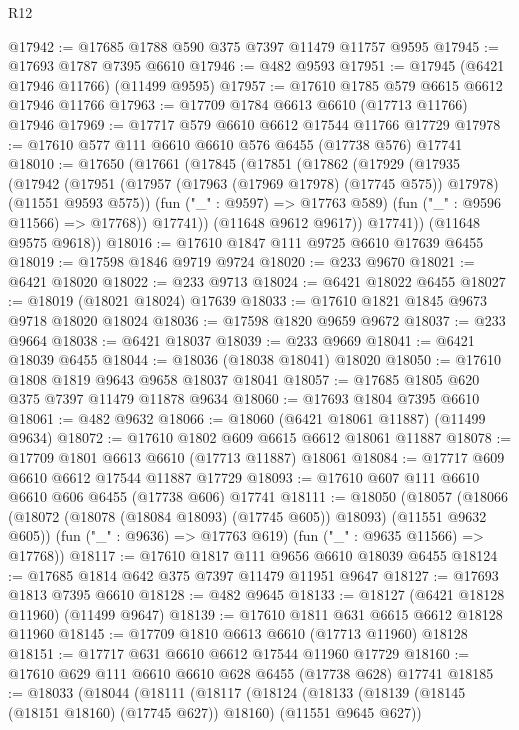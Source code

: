 \begin{lexlean}{R12}
\begin{coremodule}
{{{{{{{{{{{{{{{{{{{{{{{{{{{{{{{{{{{{{{{{{{{{{{{{{{{{{{{{{{{{{{{{{{{{{{{{{{{{{{{{{{@17942 := @17685 @1788 @590 @375 @7397 @11479 @11757 @9595
@17945 := @17693 @1787 @7395 @6610
@17946 := @482 @9593
@17951 := @17945 (@6421 @17946 @11766) (@11499 @9595)
@17957 := @17610 @1785 @579 @6615 @6612 @17946 @11766
@17963 := @17709 @1784 @6613 @6610 (@17713 @11766) @17946
@17969 := @17717 @579 @6610 @6612 @17544 @11766 @17729
@17978 := @17610 @577 @111 @6610 @6610 @576 @6455 (@17738 @576) @17741
@18010 := @17650
    (@17661
      (@17845
        (@17851
          (@17862
            (@17929
              (@17935
                (@17942
                  (@17951
                    (@17957 (@17963 (@17969 @17978) (@17745 @575)) @17978)
                    (@11551 @9593 @575))
                  (fun ("_" : @9597) => @17763 @589)
                  (fun ("_" : @9596 @11566) => @17768))
                @17741))
            (@11648 @9612 @9617))
          @17741))
      (@11648 @9575 @9618))
@18016 := @17610 @1847 @111 @9725 @6610 @17639 @6455
@18019 := @17598 @1846 @9719 @9724
@18020 := @233 @9670
@18021 := @6421 @18020
@18022 := @233 @9713
@18024 := @6421 @18022 @6455
@18027 := @18019 (@18021 @18024) @17639
@18033 := @17610 @1821 @1845 @9673 @9718 @18020 @18024
@18036 := @17598 @1820 @9659 @9672
@18037 := @233 @9664
@18038 := @6421 @18037
@18039 := @233 @9669
@18041 := @6421 @18039 @6455
@18044 := @18036 (@18038 @18041) @18020
@18050 := @17610 @1808 @1819 @9643 @9658 @18037 @18041
@18057 := @17685 @1805 @620 @375 @7397 @11479 @11878 @9634
@18060 := @17693 @1804 @7395 @6610
@18061 := @482 @9632
@18066 := @18060 (@6421 @18061 @11887) (@11499 @9634)
@18072 := @17610 @1802 @609 @6615 @6612 @18061 @11887
@18078 := @17709 @1801 @6613 @6610 (@17713 @11887) @18061
@18084 := @17717 @609 @6610 @6612 @17544 @11887 @17729
@18093 := @17610 @607 @111 @6610 @6610 @606 @6455 (@17738 @606) @17741
@18111 := @18050
    (@18057
      (@18066 (@18072 (@18078 (@18084 @18093) (@17745 @605)) @18093) (@11551 @9632 @605))
      (fun ("_" : @9636) => @17763 @619)
      (fun ("_" : @9635 @11566) => @17768))
@18117 := @17610 @1817 @111 @9656 @6610 @18039 @6455
@18124 := @17685 @1814 @642 @375 @7397 @11479 @11951 @9647
@18127 := @17693 @1813 @7395 @6610
@18128 := @482 @9645
@18133 := @18127 (@6421 @18128 @11960) (@11499 @9647)
@18139 := @17610 @1811 @631 @6615 @6612 @18128 @11960
@18145 := @17709 @1810 @6613 @6610 (@17713 @11960) @18128
@18151 := @17717 @631 @6610 @6612 @17544 @11960 @17729
@18160 := @17610 @629 @111 @6610 @6610 @628 @6455 (@17738 @628) @17741
@18185 := @18033
    (@18044
      (@18111
        (@18117
          (@18124
            (@18133 (@18139 (@18145 (@18151 @18160) (@17745 @627)) @18160) (@11551 @9645 @627))
}}}}}}}}}}}}}}}}}}}}}}}}}}}}}}}}}}}}}}}}}}}}}}}}}}}}}}}}}}}}}}}}}}}}}}}}}}}}}}}}}}
\end{coremodule}
\end{lexlean}
